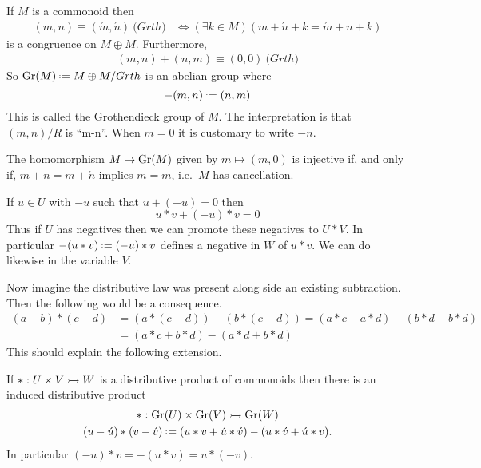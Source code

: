 \begin{theorem}
    If $M$ is a commonoid then 
    \begin{align*}
        (m,n) \equiv (\acute{m},\acute{n}) \pod{Grth} & \Leftrightarrow (\exists k\in M)(m+\acute{n}+k=\acute{m}+n+k)
    \end{align*}
    is a congruence on $M\oplus M$.  Furthermore,
    \begin{align*}
        (m,n)+(n,m) \equiv (0,0) \pod{Grth}
    \end{align*}
    So $\Gr(M)\defeq M\oplus M/Grth$ is an abelian group where 
    \[
        -(m,n)\defeq (n,m)
    \]
    This is called the Grothendieck group of $M$.
    The interpretation is that $(m,n)/R$ is ``m-n''.  When $m=0$ it is customary to write $-n$.

    The homomorphism $M\to \operatorname{Gr}(M)$ given by $m\mapsto (m,0)$ is injective 
    if, and only if, $m+n=m+\acute{n}$ implies $m=m$, i.e.\ $M$ has cancellation.
\end{theorem}

\begin{proposition}
    If $u\in U$ with $-u$ such that $u+(-u)=0$ then 
    \[
        u*v + (-u)*v =0
    \]
    Thus if $U$ has negatives then we can promote these negatives to $U*V$.
    In particular $-(u*v)\defeq (-u)*v$ defines a negative in $W$ of $u*v$.
    We can do likewise in the variable $V$.  
\end{proposition}
Now imagine the distributive law was present along side an existing subtraction.
Then the following would be a consequence.
\begin{align*}
    (a-b)*(c-d) & = (a*(c-d))-(b*(c-d))
        = (a*c-a*d)-(b*d-b*d)\\
        & =(a*c+b*d)-(a*d+b*d)
\end{align*}
This should explain the following extension.

\begin{corollary}
    If $*:U\times V\rightarrowtail W$ is a distributive product of commonoids then there is an 
    induced distributive product 
    \begin{gather*}
        * :\Gr(U)\times \Gr(V)\bmto \Gr(W)\\
        (u-\acute{u})*(v-\acute{v})
        \defeq (u*v+\acute{u}*\acute{v})-(u*\acute{v}+\acute{u}*v).
    \end{gather*}
    In particular $(-u)*v=-(u*v)=u*(-v)$.
\end{corollary}